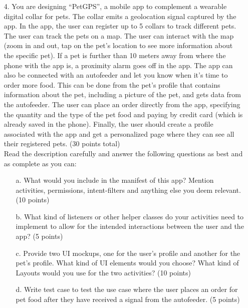 \documentclass[12pt]{article}
\begin{document}
\begin{itemize}
    \item[4.] You are designing “PetGPS”, a mobile app to complement a wearable digital collar for pets. The collar emits a geolocation signal captured by the app.
    In the app, the user can register up to 5 collars to track different pets. The user can track the pets on a map. The user can interact with the map (zoom in and out, tap on the pet’s location to see more information about the specific pet). If a pet is further than 10 meters away from where the phone with the app is, a proximity alarm goes off in the app. The app can also be connected with an autofeeder and let you know when it’s time to order more food. This can be done from the pet’s profile that contains information about the pet, including a picture of the pet, and gets data from the autofeeder. The user can place an order directly from the app, specifying the quantity and the type of the pet food and paying by credit card (which is already saved in the phone). Finally, the user should create a profile associated with the app and get a personalized page where they can see all their registered pets.  (30 points total)\\

    Read the description carefully and answer the following questions as best and as complete as you can:

    \begin{itemize}
        \item[a.] What would you include in the manifest of this app? Mention activities, permissions, intent-filters and anything else you deem relevant. (10 points)
        \item[b.] What kind of listeners or other helper classes do your activities need to implement to allow for the intended interactions between the user and the app? (5 points)
        \item[c.] Provide two UI mockups, one for the user’s profile and another for the pet’s profile. What kind of UI elements would you choose? What kind of Layouts would you use for the two activities? (10 points)
        \item[d.] Write test case to test the use case where the user places an order for pet food after they have received a signal from the autofeeder. (5 points)
    \end{itemize}

\end{itemize}
\end{document}
